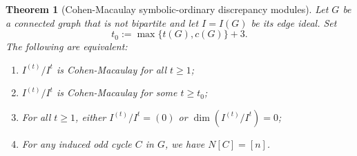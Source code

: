 \documentclass[12pt]{amsart}
\numberwithin{equation}{section}
\newtheorem{theorem}{Theorem}[section]
\theoremstyle{definition}
\theoremstyle{definition}
\begin{document}
\begin{theorem}[Cohen-Macaulay symbolic-ordinary discrepancy modules] \label{thm.CMEdge}
	Let $G$ be a connected graph that is not bipartite and let $I = I(G)$ be its edge ideal.
	Set
	\[
	t_0:=\max\{t(G),c(G)\}+3.
	\]
	The following are equivalent:
	\begin{enumerate}
		\item[(1)] $I^{(t)}/I^{t}$ is Cohen-Macaulay for all $t \ge 1$;
		\item[(2)] $I^{(t)}/I^{t}$ is Cohen-Macaulay for some $t\ge t_0$;
		\item[(3)] For all $t \ge 1$, either $I^{(t)}/I^t = (0)$ or $\dim(I^{(t)}/I^t) = 0$;
		\item[(4)] For any induced odd cycle $C$ in $G$, we have $N[C] = [n]$.
	\end{enumerate}
\end{theorem}
\end{document}
